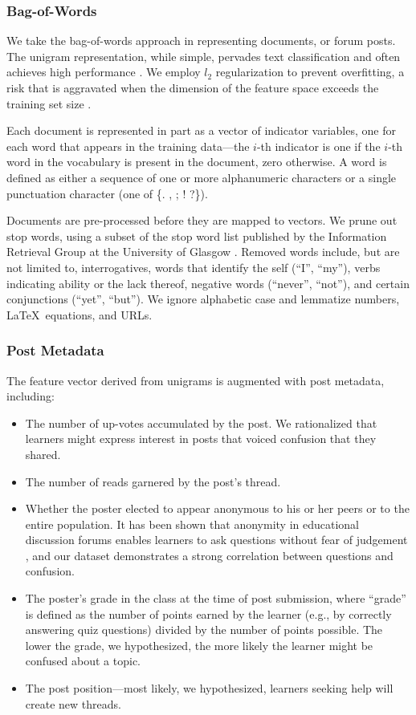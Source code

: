 \documentclass{edm_template}
\begin{document}
\subsubsection{Bag-of-Words}
We take the bag-of-words approach in representing documents, or forum posts. The unigram representation, while simple, pervades text classification and often achieves high performance \cite{boulis2005text}. We employ $l_{2}$ regularization to prevent overfitting, a risk that is aggravated when the dimension of the feature space exceeds the training set size \cite{Ng:2004:FSL:1015330.1015435}.

Each document is represented in part as a vector of indicator variables, one for each word that appears in the training data---the $i$-th indicator is one if the $i$-th word in the vocabulary is present in the document, zero otherwise. A word is defined as either a sequence of one or more alphanumeric characters or a single punctuation character (one of \{. , ; ! ?\}). 

Documents are pre-processed before they are mapped to vectors. We prune out stop words, using a subset of the stop word list published by the Information Retrieval Group at the University of Glasgow \cite{glasgow}. Removed words include, but are not limited to, interrogatives, words that identify the self (``I'', ``my''), verbs indicating ability or the lack thereof, negative words (``never'', ``not''), and certain conjunctions (``yet'', ``but''). We ignore alphabetic case and lemmatize numbers, \LaTeX\ equations, and URLs.

\subsubsection{Post Metadata}
The feature vector derived from unigrams is augmented with post metadata, including: 
\vspace{-15pt}
\begin{itemize}
\setlength\itemsep{0.05em}
       \item The number of up-votes accumulated by the post. We rationalized that learners might express interest in posts that voiced confusion that they shared. 
       \item The number of reads garnered by the post's thread.
       \item Whether the poster elected to appear anonymous to his or her peers or to the entire population. It has been shown that anonymity in educational discussion forums enables learners to ask questions without fear of judgement \cite{freeman2004student}, and our dataset demonstrates a strong correlation between questions and confusion.
       \item The poster's grade in the class at the time of post submission, where ``grade'' is defined as the number of points earned by the learner (e.g., by correctly answering quiz questions) divided by the number of points possible. The lower the grade, we hypothesized, the more likely the learner might be confused about a topic.
       \item The post position---most likely, we hypothesized, learners seeking help will create new threads.
\end{itemize}
\end{document}
